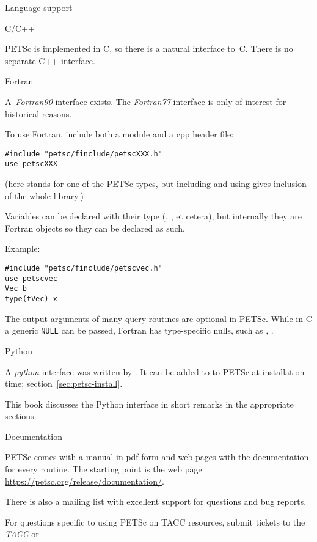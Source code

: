  {Language support}

 {C/C++}

PETSc is implemented in C, so there is a natural interface
to~C. There is no separate C++ interface.

 {Fortran}

A~\emph{Fortran90}
interface exists. The \emph{Fortran77}
interface is only of
interest for historical reasons.

To use Fortran, include both a module and a cpp header file:
\begin{verbatim}
#include "petsc/finclude/petscXXX.h"
use petscXXX
\end{verbatim}
(here  stands for one of the PETSc types, but including
 and using 
gives inclusion of the whole library.)

Variables can be declared with their type (,
,  et cetera), but internally they are
Fortran  objects so they can be declared as such.

Example:
\begin{lstlisting}
#include "petsc/finclude/petscvec.h"
use petscvec
Vec b
type(tVec) x
\end{lstlisting}

The output arguments of many query routines are optional in PETSc.
While in C a generic \lstinline{NULL} can be passed,
Fortran has type-specific nulls, such as
, .

 {Python}
\label{sec:py-interface}

A \emph{python} interface was written by
.
It can be added to to PETSc at installation time;
section~\ref{sec:petsc-install}.

This book discusses the Python interface
in short remarks in the appropriate sections.

 {Documentation}

PETSc comes with a manual in pdf form and web pages with the
documentation for every routine. The starting point is the web page
\url{https://petsc.org/release/documentation/}.

There is also a mailing list with excellent support for questions and
bug reports.
\begin{taccnote}
  For questions specific to using PETSc on TACC resources, submit
  tickets to the \emph{TACC} or
  .
\end{taccnote}

